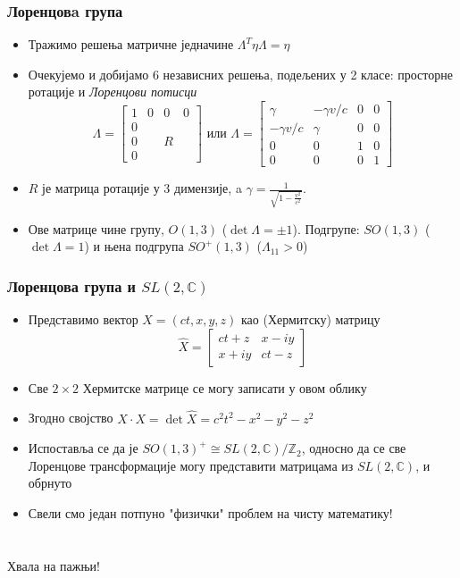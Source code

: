 \documentclass{beamer}
\theoremstyle{plain}
\theoremstyle{definition}
\begin{document}
\begin{frame}
\frametitle{Лоренцовa група}
\begin{itemize}
\item Тражимо решења матричне једначине $\Lambda^T \eta \Lambda = \eta$
\item Очекујемо и добијамо 6 независних решења, подељених у 2 класе: просторне ротације и \emph{Лоренцови потисци}
$$\Lambda = \begin{bmatrix}
    1 & 0 & 0 & 0 \\
    0 &   &   &   \\
    0 &   & R &   \\
    0 &   &   &
  \end{bmatrix} \text{ или }
  \Lambda = \begin{bmatrix}
    \gamma & -\gamma v/c & 0 & 0 \\
    -\gamma v/c & \gamma & 0 & 0 \\
    0 &  0 & 1 & 0  \\
    0 & 0  & 0 & 1
  \end{bmatrix}$$
\item $R$ је матрица ротације у 3 димензије, a $\gamma = \frac{1}{\sqrt{1-\frac{v^2}{c^2}}}$.
\item Ове матрице чине групу, $O(1, 3)$ ($\det\Lambda = \pm 1$). Подгрупе: $SO(1, 3)$ ($\det\Lambda = 1$) и њена подгрупа $SO^+(1, 3)$ ($\Lambda_{11}>0$)
\end{itemize}
\end{frame}

\begin{frame}
\frametitle{Лоренцова група и $SL(2, \mathbb{C})$}
\begin{itemize}
\item Представимо вектор $X = (ct, x, y, z)$ као (Хермитску) матрицу
$$\hat X = \begin{bmatrix}
            ct+z & x-iy \\
            x+iy & ct-z
           \end{bmatrix}$$
\item Све $2\times 2$ Хермитске матрице се могу записати у овом облику
\item Згодно својство $X \cdot X = \det \hat X = c^2 t^2 - x^2 - y^2 - z^2$
\item Испоставља се да је $SO(1, 3)^+\cong SL(2, \mathbb{C})/\mathbb{Z}_2$, односно да се све Лоренцове трансформације могу представити матрицама из $SL(2, \mathbb{C})$, и обрнуто
\item Свели смо један потпуно "физички" проблем на чисту математику!

\end{itemize}
\end{frame}


\section{}
\begin{frame}
\frametitle{}
\centering
{\Huge Хвала на пажњи!}

\end{frame}
\end{document}
